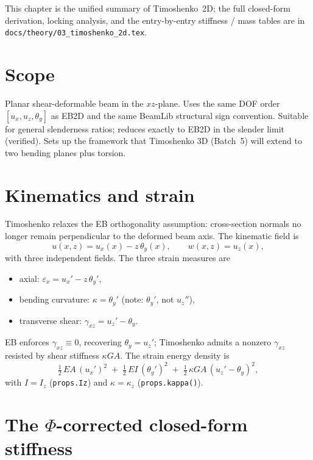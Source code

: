 \documentclass[11pt,a4paper]{book}
\begin{document}
This chapter is the unified summary of Timoshenko~2D; the full closed-form derivation, locking analysis, and the entry-by-entry stiffness / mass tables are in \texttt{docs/theory/03\_timoshenko\_2d.tex}.

\section{Scope}

Planar shear-deformable beam in the $xz$-plane. Uses the same DOF order $[u_x, u_z, \theta_y]$ as EB2D and the same BeamLib structural sign convention. Suitable for general slenderness ratios; reduces exactly to EB2D in the slender limit (verified). Sets up the framework that Timoshenko 3D (Batch~5) will extend to two bending planes plus torsion.

\section{Kinematics and strain}

Timoshenko relaxes the EB orthogonality assumption: cross-section normals no longer remain perpendicular to the deformed beam axis. The kinematic field is
\[
u(x, z) = u_x(x) - z\,\theta_y(x), \qquad w(x, z) = u_z(x),
\]
with three independent fields. The three strain measures are
\begin{itemize}
    \item axial: $\varepsilon_x = u_x' - z\,\theta_y'$,
    \item bending curvature: $\kappa = \theta_y'$ (note: $\theta_y'$, not $u_z''$),
    \item transverse shear: $\gamma_{xz} = u_z' - \theta_y$.
\end{itemize}
EB enforces $\gamma_{xz} \equiv 0$, recovering $\theta_y = u_z'$; Timoshenko admits a nonzero $\gamma_{xz}$ resisted by shear stiffness $\kappa GA$. The strain energy density is
\[
\tfrac{1}{2}\,EA\,(u_x')^2 \;+\; \tfrac{1}{2}\,EI\,(\theta_y')^2 \;+\; \tfrac{1}{2}\,\kappa GA\,(u_z' - \theta_y)^2,
\]
with $I = I_z$ (\texttt{props.Iz}) and $\kappa = \kappa_z$ (\texttt{props.kappa()}).

\section{The \texorpdfstring{$\Phi$}{Phi}-corrected closed-form stiffness}
\end{document}
